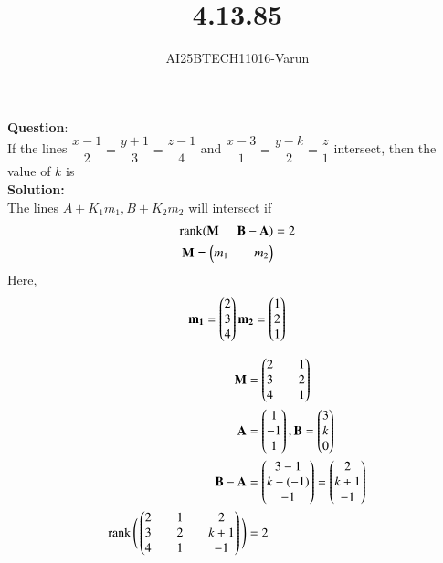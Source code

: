 \documentclass[journal]{IEEEtran}
\begin{document}

\vspace{3cm}

\title{4.13.85}
\author{AI25BTECH11016-Varun}
 \maketitle
{\let\newpage\relax\maketitle}
\renewcommand{\thefigure}{\theenumi}
\renewcommand{\thetable}{\theenumi}
\setlength{\intextsep}{10pt} %

\renewcommand{\thetable}{\theenumi}
\textbf{Question}:\\
If the lines $\dfrac{x-1}{2} = \dfrac{y+1}{3} = \dfrac{z-1}{4}$ 
and $\dfrac{x-3}{1} = \dfrac{y-k}{2} = \dfrac{z}{1}$ intersect, 
then the value of $k$ is\\
\textbf{Solution:}\\
The lines $A+ K_1m_1,B+K_2m_2$ will intersect if 
\begin{align}
\operatorname{rank}(\mathbf{M} \hspace{5mm}  \mathbf{B-A})&=2\\
\mathbf{M}=\begin{pmatrix}m_1&&m_2\end{pmatrix}\\
\end{align}
Here,
\begin{align}
\mathbf{m_1}=\begin{pmatrix}2\\3\\4\end{pmatrix} \mathbf{m_2}=\begin{pmatrix}1\\2\\1\end{pmatrix}
\end{align}

\begin{align}
\mathbf{M}&=\begin{pmatrix}2&&1\\3&&2\\4&&1\end{pmatrix}\\
\mathbf{A}&=\begin{pmatrix}1\\-1\\1\end{pmatrix} ,\mathbf{B}=\begin{pmatrix}3\\k\\0\end{pmatrix}\\
\mathbf{B-A}&=\begin{pmatrix}3-1\\k-(-1)\\-1\end{pmatrix}=\begin{pmatrix}2\\k+1\\-1\end{pmatrix}\\
\operatorname{rank}\Bigg(\begin{pmatrix}2&&1&&2\\3&&2&&k+1\\4&&1&&-1\end{pmatrix}\Bigg)&=2
\end{align}
\end{document}
